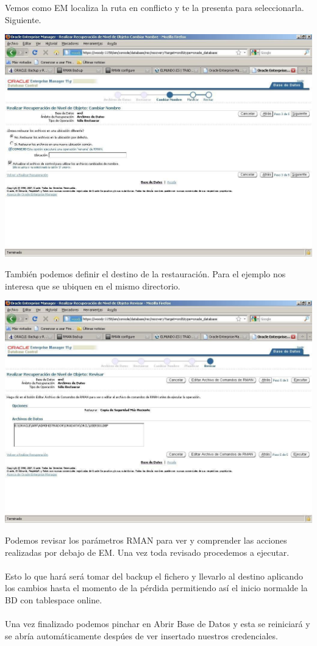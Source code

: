 \documentclass[12pt,letterpaper]{article}
\begin{document}
{Vemos  como  EM  localiza  la  ruta  en  conflicto  y  te  la  presenta  para  seleccionarla. Siguiente.

\includegraphics[width=20cm]{./IMG/img35.png}

\begin{enumerate}
También podemos definir el destino de la restauración. Para el ejemplo nos interesa que se ubiquen en el mismo directorio. \\
\end{enumerate}

\newpage

\includegraphics[width=20cm]{./IMG/img36.png}
\begin{enumerate}
Podemos revisar los parámetros RMAN para ver y comprender las acciones realizadas por debajo de EM. Una vez toda revisado procedemos a ejecutar. \\
\\
Esto lo que hará será tomar del backup el fichero y llevarlo al destino aplicando los cambios hasta el momento de la pérdida permitiendo así el inicio normalde la BD con tablespace online. \\
\\
Una vez finalizado podemos pinchar en Abrir Base de Datos y esta se reiniciará y se abría automáticamente despúes de ver insertado nuestros credenciales. \\
\\
\end{enumerate}

}
\end{document}
